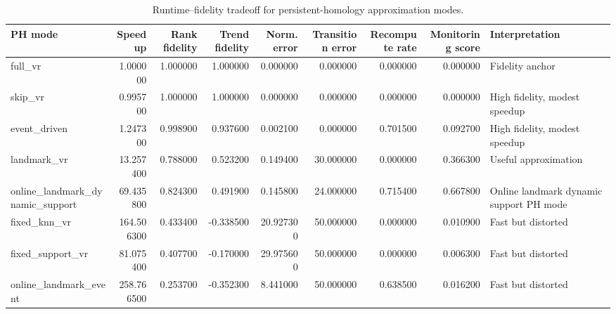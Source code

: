 \begin{table}
\caption{Runtime--fidelity tradeoff for persistent-homology approximation modes.}
\label{tab:ph-runtime-fidelity}
\begin{tabular}{lrrrrrrrl}
\toprule
PH mode & Speedup & Rank fidelity & Trend fidelity & Norm. error & Transition error & Recompute rate & Monitoring score & Interpretation \\
\midrule
full\_vr & 1.000000 & 1.000000 & 1.000000 & 0.000000 & 0.000000 & 0.000000 & 0.000000 & Fidelity anchor \\
skip\_vr & 0.995700 & 1.000000 & 1.000000 & 0.000000 & 0.000000 & 0.000000 & 0.000000 & High fidelity, modest speedup \\
event\_driven & 1.247300 & 0.998900 & 0.937600 & 0.002100 & 0.000000 & 0.701500 & 0.092700 & High fidelity, modest speedup \\
landmark\_vr & 13.257400 & 0.788000 & 0.523200 & 0.149400 & 30.000000 & 0.000000 & 0.366300 & Useful approximation \\
online\_landmark\_dynamic\_support & 69.435800 & 0.824300 & 0.491900 & 0.145800 & 24.000000 & 0.715400 & 0.667800 & Online landmark dynamic support PH mode \\
fixed\_knn\_vr & 164.506300 & 0.433400 & -0.338500 & 20.927300 & 50.000000 & 0.000000 & 0.010900 & Fast but distorted \\
fixed\_support\_vr & 81.075400 & 0.407700 & -0.170000 & 29.975600 & 50.000000 & 0.000000 & 0.006300 & Fast but distorted \\
online\_landmark\_event & 258.766500 & 0.253700 & -0.352300 & 8.441000 & 50.000000 & 0.638500 & 0.016200 & Fast but distorted \\
\bottomrule
\end{tabular}
\end{table}
